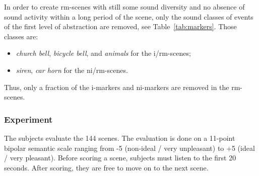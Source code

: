 \documentclass[12pt]{elsarticle}
\begin{document}
In order to create rm-scenes with still some sound diversity and no  absence of sound activity within a long period of the scene, only the sound classes of events of the first level of abstraction are removed, see Table~\ref{tab:markers}. Those classes are:


\begin{itemize}
\item \emph{church bell}, \emph{bicycle bell}, and \emph{animals} for the i/rm-scenes;
\item \emph{siren}, \emph{car horn} for the ni/rm-scenes.
\end{itemize}


Thus, only a fraction of the i-markers and ni-markers are removed in the rm-scenes.

\subsubsection*{Experiment}




The subjects evaluate the 144 scenes. The evaluation is done on a 11-point bipolar semantic scale ranging from -5 (non-ideal / very unpleasant) to +5 (ideal / very pleasant). Before scoring a scene, subjects must listen to the first 20 seconds. After scoring, they are free to move on to the next scene.
\end{document}
